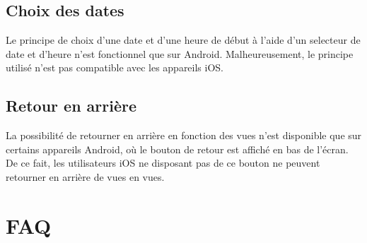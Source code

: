 \documentclass[10pt]{article}
\begin{document}
\subsection{Choix des dates}

Le principe de choix d'une date et d'une heure de début à l'aide d'un selecteur de date et d'heure n'est fonctionnel que sur Android. Malheureusement, le principe utilisé n'est pas compatible avec les appareils iOS.

\subsection{Retour en arrière}

La possibilité de retourner en arrière en fonction des vues n'est disponible que sur certains appareils Android, où le bouton de retour est affiché en bas de l'écran. De ce fait, les utilisateurs iOS ne disposant pas de ce bouton ne peuvent retourner en arrière de vues en vues.

\section{FAQ}
\end{document}
